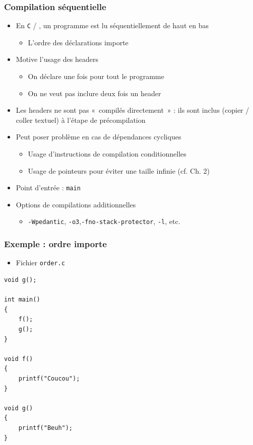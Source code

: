 \begin{frame}
\frametitle{Compilation séquentielle}
\begin{itemize}[<+->]
\item En \texttt{C} / \cpp, un programme est lu séquentiellement de haut en bas
	\begin{itemize}
	\item L'ordre des déclarations importe
	\end{itemize}
\item Motive l'usage des headers
	\begin{itemize}
	\item On déclare une fois pour tout le programme
	\item On ne veut pas inclure deux fois un header
	\end{itemize}
\item Les headers ne sont pas «~compilés directement~» : ils sont inclus (copier / coller textuel) à l'étape de précompilation
\item Peut poser problème en cas de dépendances cycliques
	\begin{itemize}
	\item Usage d'instructions de compilation conditionnelles
	\item Usage de pointeurs pour éviter une taille infinie (cf. Ch. 2)
	\end{itemize}
\item Point d'entrée : \texttt{main}
\item Options de compilations additionnelles
	\begin{itemize}
	\item \texttt{-Wpedantic}, \texttt{-o3},\texttt{-fno-stack-protector}, \texttt{-l}, etc.
	\end{itemize}
\end{itemize}
\end{frame}

\begin{frame}[containsverbatim]
\frametitle{Exemple : ordre importe}
\begin{itemize}
\item Fichier \texttt{order.c}
\end{itemize}
\begin{lstlisting}
void g();

int main()
{
	f();
	g();
}

void f()
{
	printf("Coucou");
}

void g()
{
	printf("Beuh");
}
\end{lstlisting}
\end{frame}


